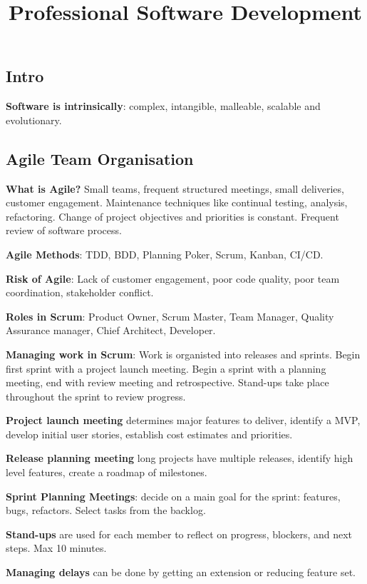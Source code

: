 \documentclass{article}
\title{Professional Software Development}
\author{}
\date{}
\begin{document}
\footnotesize

\subsection*{Intro}

\noindent \textbf{Software is intrinsically}: complex, intangible, malleable, scalable and evolutionary.


\subsection*{Agile Team Organisation}

\noindent \textbf{What is Agile?} Small teams, frequent structured meetings, small deliveries, customer engagement.
Maintenance techniques like continual testing, analysis, refactoring.
Change of project objectives and priorities is constant.
Frequent review of software process.

\noindent \textbf{Agile Methods}: TDD, BDD, Planning Poker, Scrum, Kanban, CI/CD.\@

\noindent \textbf{Risk of Agile}: Lack of customer engagement, poor code quality, poor team coordination, stakeholder conflict.

\noindent \textbf{Roles in Scrum}: Product Owner, Scrum Master, Team Manager, Quality Assurance manager, Chief Architect, Developer.

\noindent \textbf{Managing work in Scrum}: Work is organisted into releases and sprints.
Begin first sprint with a project launch meeting.
Begin a sprint with a planning meeting, end with review meeting and retrospective.
Stand-ups take place throughout the sprint to review progress.

\noindent \textbf{Project launch meeting} determines major features to deliver, identify a MVP, develop initial user stories,
establish cost estimates and priorities.

\noindent \textbf{Release planning meeting} long projects have multiple releases, identify high level features, create a roadmap of milestones.

\noindent \textbf{Sprint Planning Meetings}: decide on a main goal for the sprint: features, bugs, refactors. Select tasks from the backlog.
 
\noindent \textbf{Stand-ups} are used for each member to reflect on progress, blockers, and next steps. Max 10 minutes.

\noindent \textbf{Managing delays} can be done by getting an extension or reducing feature set.
\end{document}
